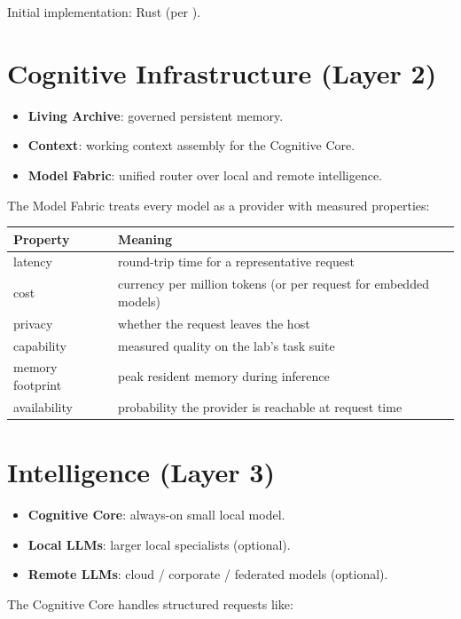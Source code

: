 Initial implementation: Rust (per ).

\section{Cognitive Infrastructure (Layer 2)}

\begin{itemize}
  \item \textbf{Living Archive}: governed persistent memory.
  \item \textbf{Context}: working context assembly for the
        Cognitive Core.
  \item \textbf{Model Fabric}: unified router over local and remote
        intelligence.
\end{itemize}

The Model Fabric treats every model as a provider with measured
properties:
\begin{longtable}{p{2.4cm}p{10.0cm}}
\toprule
\textbf{Property} & \textbf{Meaning} \\
\midrule
latency & round-trip time for a representative request \\
cost & currency per million tokens (or per request for embedded models) \\
privacy & whether the request leaves the host \\
capability & measured quality on the lab's task suite \\
memory footprint & peak resident memory during inference \\
availability & probability the provider is reachable at request time \\
\bottomrule
\end{longtable}

\section{Intelligence (Layer 3)}

\begin{itemize}
  \item \textbf{Cognitive Core}: always-on small local model.
  \item \textbf{Local LLMs}: larger local specialists (optional).
  \item \textbf{Remote LLMs}: cloud / corporate / federated models
        (optional).
\end{itemize}

The Cognitive Core handles structured requests like:


